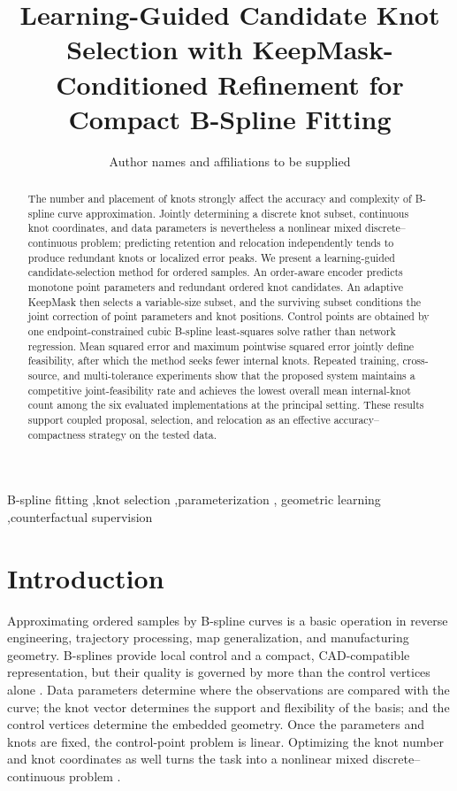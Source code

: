 \documentclass[preprint,12pt]{elsarticle}
\begin{document}
\begin{frontmatter}
\title{Learning-Guided Candidate Knot Selection with KeepMask-Conditioned
Refinement for Compact B-Spline Fitting}
\author{Author names and affiliations to be supplied}
\begin{abstract}
The number and placement of knots strongly affect the accuracy and complexity
of B-spline curve approximation. Jointly determining a discrete knot subset,
continuous knot coordinates, and data parameters is nevertheless a nonlinear
mixed discrete--continuous problem; predicting retention and relocation
independently tends to produce redundant knots or localized error peaks. We
present a learning-guided candidate-selection method for ordered samples. An
order-aware encoder predicts monotone point parameters and redundant ordered
knot candidates. An adaptive KeepMask then selects a variable-size subset, and
the surviving subset conditions the joint correction of point parameters and
knot positions. Control points are obtained by one endpoint-constrained cubic
B-spline least-squares solve rather than network regression. Mean squared
error and maximum pointwise squared error jointly define feasibility, after
which the method seeks fewer internal knots. Repeated training, cross-source,
and multi-tolerance experiments show that the proposed system maintains a
competitive joint-feasibility rate and achieves the lowest overall mean
internal-knot count among the six evaluated implementations at the principal
setting. These results support coupled proposal, selection, and relocation as
an effective accuracy--compactness strategy on the tested data.
\end{abstract}
\begin{keyword}
B-spline fitting \sep knot selection \sep parameterization \sep
geometric learning \sep counterfactual supervision
\end{keyword}
\end{frontmatter}

\section{Introduction}
Approximating ordered samples by B-spline curves is a basic operation in
reverse engineering, trajectory processing, map generalization, and
manufacturing geometry. B-splines provide local control and a compact,
CAD-compatible representation, but their quality is governed by more than the
control vertices alone \cite{piegl1997}. Data parameters determine where the
observations are compared with the curve; the knot vector determines the
support and flexibility of the basis; and the control vertices determine the
embedded geometry. Once the parameters and knots are fixed, the control-point
problem is linear. Optimizing the knot number and knot coordinates as well
turns the task into a nonlinear mixed discrete--continuous problem
\cite{jupp1978,yeh2020}.
\end{document}
